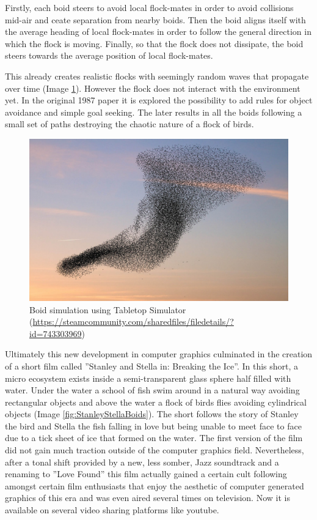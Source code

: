 \documentclass[sigconf]{acmart}
\begin{document}
Firstly, each boid steers to avoid local flock-mates in order to avoid collisions
mid-air and ceate separation from nearby boids. Then the boid aligns itself with
the average heading of local flock-mates in order to follow the general direction
in which the flock is moving. Finally, so that the flock does not dissipate, the boid
steers towards the average position of local flock-mates.

This already creates realistic flocks with seemingly random waves that propagate over
time (Image \ref{fig:steamBoids}). However the flock does not interact with the environment
yet. In the original 1987 paper it is explored the possibility to add rules for object
avoidance and simple goal seeking. The later results in all the boids following a small
set of paths destroying the chaotic nature of a flock of birds.

\begin{figure}[h]
  \centering
  \includegraphics[width=\linewidth]{images/steam_boids.png}
  \caption{Boid simulation using Tabletop Simulator (\url{https://steamcommunity.com/sharedfiles/filedetails/?id=743303969})}
  \label{fig:steamBoids}
\end{figure}

Ultimately this new development in computer graphics culminated in the creation of a
short film called ''Stanley and Stella in: Breaking the Ice''\cite{StanleyStella1987}.
In this short, a micro ecosystem exists inside a semi-transparent glass sphere half
filled with water. Under the water a school of fish swim around in a natural way avoiding
rectangular objects and above the water a flock of birds flies avoiding cylindrical
objects (Image \ref{fig:StanleyStellaBoids}). The short follows the story of Stanley
the bird and Stella the fish falling in love but being unable to meet face to face
due to a tick sheet of ice that formed on the water\cite{StanleyStellaIMDb}.
The first version of the film did not gain much traction outside of the computer
graphics field. Nevertheless, after a tonal shift provided by a new, less somber, Jazz
soundtrack and a renaming to ''Love Found'' this film actually gained a certain cult
following amongst certain film enthusiasts that enjoy the aesthetic of computer
generated graphics of this era and was even aired several times on television. Now
it is available on several video sharing platforms like youtube.
\end{document}
